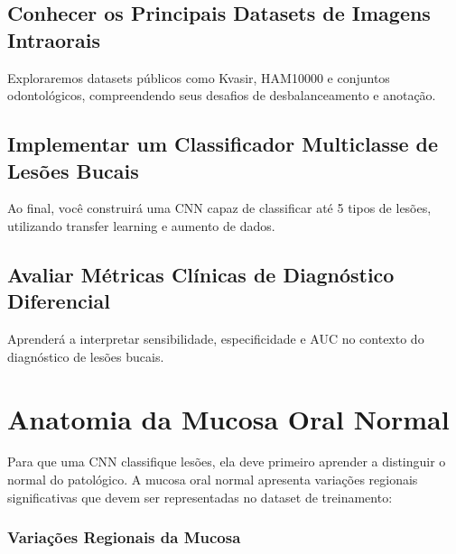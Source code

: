 \subsection{Conhecer os Principais Datasets de Imagens Intraorais}
Exploraremos datasets públicos como Kvasir, HAM10000 e conjuntos odontológicos, compreendendo seus desafios de desbalanceamento e anotação.

\subsection{Implementar um Classificador Multiclasse de Lesões Bucais}
Ao final, você construirá uma CNN capaz de classificar até 5 tipos de lesões, utilizando transfer learning e aumento de dados.

\subsection{Avaliar Métricas Clínicas de Diagnóstico Diferencial}
Aprenderá a interpretar sensibilidade, especificidade e AUC no contexto do diagnóstico de lesões bucais.

\section{Anatomia da Mucosa Oral Normal}
\label{sec:mucosa-normal}

Para que uma CNN classifique lesões, ela deve primeiro aprender a distinguir o
normal do patológico. A mucosa oral normal apresenta variações regionais
significativas que devem ser representadas no dataset de treinamento:

\subsubsection{Variações Regionais da Mucosa}

